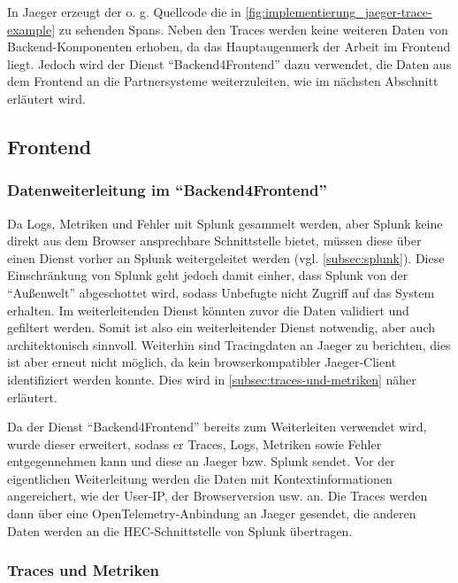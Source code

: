 In Jaeger erzeugt der o. g. Quellcode die in \autoref{fig:implementierung_jaeger-trace-example} zu sehenden Spans. Neben den Traces werden keine weiteren Daten von Backend-Komponenten erhoben, da das Hauptaugenmerk der Arbeit im Frontend liegt. Jedoch wird der Dienst \enquote{Backend4Frontend} dazu verwendet, die Daten aus dem Frontend an die Partnersysteme weiterzuleiten, wie im nächsten Abschnitt erläutert wird.

\subsection{Frontend}

\subsubsection{Datenweiterleitung im \enquote{Backend4Frontend}}

Da Logs, Metriken und Fehler mit Splunk gesammelt werden, aber Splunk keine direkt aus dem Browser ansprechbare Schnittstelle bietet, müssen diese über einen Dienst vorher an Splunk weitergeleitet werden (vgl. \autoref{subsec:splunk}). Diese Einschränkung von Splunk geht jedoch damit einher, dass Splunk von der \enquote{Außenwelt} abgeschottet wird, sodass Unbefugte nicht Zugriff auf das System erhalten. Im weiterleitenden Dienst könnten zuvor die Daten validiert und gefiltert werden. Somit ist also ein weiterleitender Dienst notwendig, aber auch architektonisch sinnvoll. Weiterhin sind Tracingdaten an Jaeger zu berichten, dies ist aber erneut nicht möglich, da kein browserkompatibler Jaeger-Client identifiziert werden konnte. Dies wird in \autoref{subsec:traces-und-metriken} näher erläutert.

Da der Dienst \enquote{Backend4Frontend} bereits zum Weiterleiten verwendet wird, wurde dieser erweitert, sodass er Traces, Logs, Metriken sowie Fehler entgegennehmen kann und diese an Jaeger bzw. Splunk sendet. Vor der eigentlichen Weiterleitung werden die Daten mit Kontextinformationen angereichert, wie der User-IP, der Browserversion usw. an. Die Traces werden dann über eine OpenTelemetry-Anbindung an Jaeger gesendet, die anderen Daten werden an die HEC-Schnittstelle \cite{SplunkHEC} von Splunk übertragen.

\subsubsection{Traces und Metriken}
\label{subsec:traces-und-metriken}

